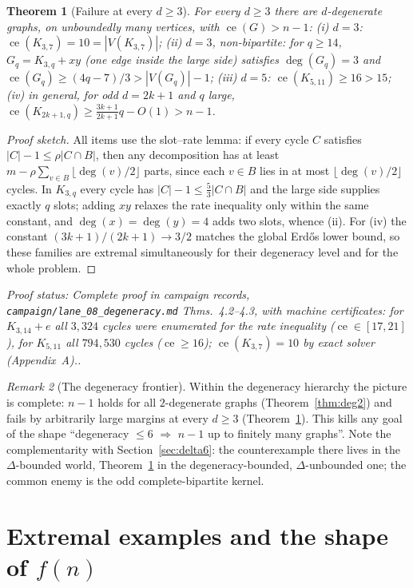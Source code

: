 \documentclass[a4paper,11pt]{amsart}
\newtheorem{theorem}{Theorem}[section]
\theoremstyle{definition}
\theoremstyle{remark}
\newtheorem{remark}[theorem]{Remark}
\newcommand{\ce}{\operatorname{ce}}
\newcommand{\proofsrc}[1]{\par\smallskip\noindent\begin{sloppypar}\small\emph{Proof status: #1.}\end{sloppypar}\par\smallskip}
\begin{document}
\begin{theorem}[Failure at every $d\ge3$]\label{thm:degex}
For every $d\ge3$ there are $d$-degenerate graphs, on unboundedly many vertices, with $\ce(G)>n-1$:
(i) $d=3$: $\ce(K_{3,7})=10=|V(K_{3,7})|$;
(ii) $d=3$, non-bipartite: for $q\ge14$, $G_q=K_{3,q}+xy$ (one edge inside the large side) satisfies
$\deg(G_q)=3$ and $\ce(G_q)\ge(4q-7)/3>|V(G_q)|-1$;
(iii) $d=5$: $\ce(K_{5,11})\ge16>15$;
(iv) in general, for odd $d=2k+1$ and $q$ large,
$\ce(K_{2k+1,q})\ge\frac{3k+1}{2k+1}q-O(1)>n-1$.
\end{theorem}
\begin{proof}[Proof sketch]
All items use the slot--rate lemma: if every cycle $C$ satisfies $|C|-1\le\rho|C\cap B|$, then any
decomposition has at least $m-\rho\sum_{v\in B}\lfloor\deg(v)/2\rfloor$ parts, since each $v\in B$ lies in
at most $\lfloor\deg(v)/2\rfloor$ cycles. In $K_{3,q}$ every cycle has $|C|-1\le\tfrac53|C\cap B|$ and the
large side supplies exactly $q$ slots; adding $xy$ relaxes the rate inequality only within the same
constant, and $\deg(x)=\deg(y)=4$ adds two slots, whence (ii). For (iv) the constant
$(3k+1)/(2k+1)\to3/2$ matches the global Erd\H{o}s lower bound, so these families are extremal
simultaneously for their degeneracy level and for the whole problem.
\end{proof}
\proofsrc{Complete proof in campaign records, \texttt{campaign/lane\_08\_degeneracy.md} Thms.~4.2--4.3, with
machine certificates: for $K_{3,14}+e$ all $3{,}324$ cycles were enumerated for the rate inequality
($\ce\in[17,21]$), for $K_{5,11}$ all $794{,}530$ cycles ($\ce\ge16$); $\ce(K_{3,7})=10$ by exact solver
(Appendix~A).}

\begin{remark}[The degeneracy frontier]\label{rem:frontier}
Within the degeneracy hierarchy the picture is complete: $n-1$ holds for all $2$-degenerate graphs
(Theorem~\ref{thm:deg2}) and fails by arbitrarily large margins at every $d\ge3$ (Theorem~\ref{thm:degex}).
This kills any goal of the shape ``degeneracy $\le6$ $\Rightarrow$ $n-1$ up to finitely many graphs''.
Note the complementarity with Section~\ref{sec:delta6}: the counterexample there lives in the
$\Delta$-bounded world, Theorem~\ref{thm:degex} in the degeneracy-bounded, $\Delta$-unbounded one; the
common enemy is the odd complete-bipartite kernel.
\end{remark}

\section{Extremal examples and the shape of $f(n)$}\label{sec:extremal}
\end{document}
